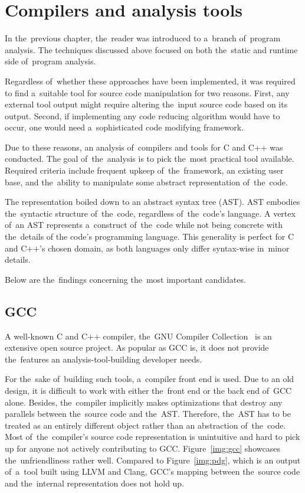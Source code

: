 \chapter{Compilers and analysis tools}\label{chap:tools}

In the~previous chapter, the~reader was introduced to a~branch of~program
ana\-ly\-sis. 
The techniques discussed above focused on both the~static and runtime
side of~program analysis. 

Regardless of~whether these approaches have been implemented, it was 
required to find a~suitable tool for source code manipulation for two reasons. 
First, any external tool output might require altering the~input source code 
based on its output. 
Second, if implementing any code reducing algorithm would have to occur, 
one would need a~sophisticated code modifying framework. 

Due to these reasons, an analysis of~compilers and tools for C and C++ was conducted. 
The goal of~the~analysis is to pick the~most practical tool available. 
Required criteria include frequent upkeep of~the~framework, 
an existing user base, and the~ability to manipulate some abstract 
representation of~the~code.

The representation boiled down to an abstract syntax tree (AST). 
AST embodies the~syntactic structure of~the~code, regardless of~the~code's language. 
A vertex of~an AST represents a~construct of~the~code while not being concrete 
with the~details of the code's programming language. 
This generality is perfect for C and C++'s chosen domain, 
as both languages only differ syntax-wise in~minor details.

Below are the~findings concerning the~most important candidates.

\section{GCC}

A well-known C and C++ compiler, the~GNU Compiler Collection~\citep{gcc:online} 
is an extensive
open source project. 
As popular as GCC is, it does not provide the~features an analysis-tool-building 
developer needs. 

For the~sake of~building such tools, a~compiler front end is used. 
Due to an old design, it is difficult to work with either the~front end or 
the back end of~GCC alone. 
Besides, the~compiler implicitly makes optimizations that destroy any parallels 
between the~source code and the~AST. 
Therefore, the~AST has to be treated as an entirely different object rather than 
an abstraction of~the~code. 
Most of~the~compiler's source code representation is unintuitive and 
hard to pick up for anyone not actively contributing to GCC. 
Figure~\ref{img:gcc} showcases the~unfriendliness rather well.
Compared to Figure~\ref{img:pdg}, which is an output of~a~tool built using
LLVM and Clang, GCC's mapping between the~source code and the~internal
representation does not hold up.

